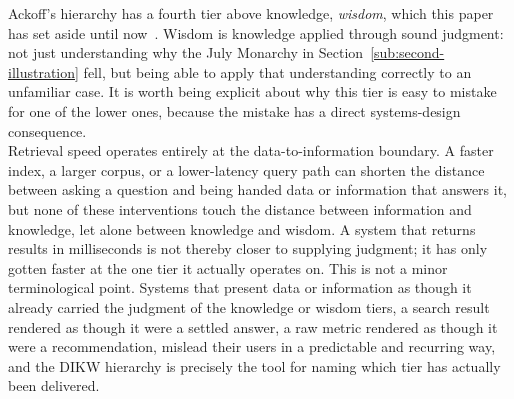 Ackoff's hierarchy has a fourth tier above knowledge, \emph{wisdom}, which
this paper has set aside until now~\autocite{ackoff1989}. Wisdom is knowledge
applied through sound judgment: not just understanding why the July Monarchy
in Section~\ref{sub:second-illustration} fell, but being able to apply that
understanding correctly to an unfamiliar case. It is worth being explicit
about why this tier is easy to mistake for one of the lower ones, because the
mistake has a direct systems-design consequence.\\
Retrieval speed operates entirely at the data-to-information boundary. A
faster index, a larger corpus, or a lower-latency query path can shorten the
distance between asking a question and being handed data or information that
answers it, but none of these interventions touch the distance between
information and knowledge, let alone between knowledge and wisdom. A system
that returns results in milliseconds is not thereby closer to supplying
judgment; it has only gotten faster at the one tier it actually operates on.
This is not a minor terminological point. Systems that present data or
information as though it already carried the judgment of the knowledge or
wisdom tiers, a search result rendered as though it were a settled answer, a
raw metric rendered as though it were a recommendation, mislead their users in
a predictable and recurring way, and the DIKW hierarchy is precisely the tool
for naming which tier has actually been delivered.